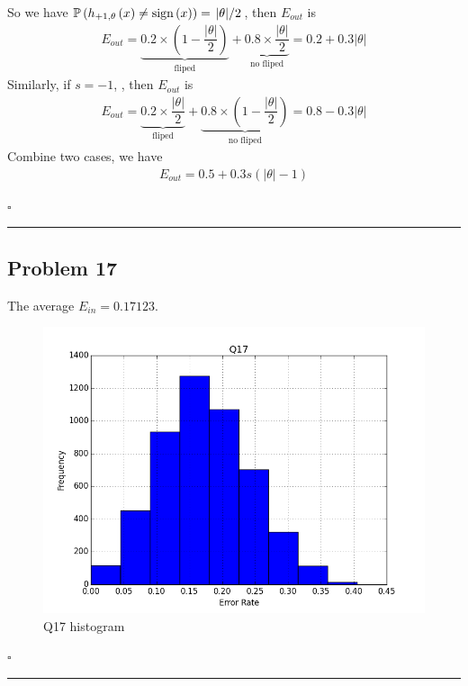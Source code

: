 \documentclass[12pt]{article}
\newcommand*{\QEDB}{\hfill\ensuremath{\square}}
\newcommand{\ParTh}[1]{\left(#1\right)}
\newcommand{\AbsVal}[1]{\left|#1\right|}
\newcommand{\Divide}[2]{\left.#1\middle/#2\right.}
\newcommand{\horrule}[1]{\rule{\linewidth}{#1}}
\begin{document}
So we have $\mathbb{P}\ParTh{h_{+1,\theta}\ParTh{x}\neq\text{sign}\ParTh{x}}=\Divide{\AbsVal{\theta}}{2}$, then $E_{out}$ is
\begin{align}
E_{out}=\underbrace{ 0.2 \times \ParTh{1-\dfrac{\AbsVal{\theta}}{2}} }_{\text{fliped}}+\underbrace{ 0.8 \times \dfrac{\AbsVal{\theta}}{2} }_{\text{no fliped}}=0.2+0.3\AbsVal{\theta}
\end{align}
Similarly, if $s=-1$, , then $E_{out}$ is
\begin{align}
E_{out}=\underbrace{ 0.2 \times \dfrac{\AbsVal{\theta}}{2} }_{\text{fliped}}+\underbrace{ 0.8 \times \ParTh{1-\dfrac{\AbsVal{\theta}}{2}} }_{\text{no fliped}}=0.8-0.3\AbsVal{\theta}
\end{align}
Combine two cases, we have
\begin{align}
E_{out}=0.5+0.3s\ParTh{\AbsVal{\theta}-1}
\end{align}

\QEDB

\horrule{0.5pt}

\newpage
\subsection*{Problem 17}

The average $E_{in}=0.17123$.
\begin{figure}[h]
	\centering
	\includegraphics[scale=0.3]{Q17.png}
	\caption{Q17 histogram}
	\label{Q18}
\end{figure}

\QEDB

\horrule{0.5pt}
\end{document}
